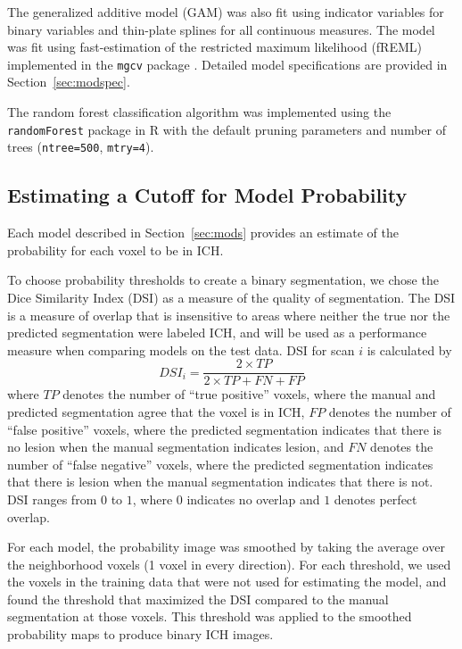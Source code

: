 \documentclass{elsarticle_nonatbib}\usepackage[]{graphicx}\usepackage[]{color}
\newcommand{\pkg}[1]{\texttt{#1}}
\newcommand{\code}[1]{\texttt{#1}}
\begin{document}
The generalized additive model (GAM) \citep{hastie_generalized_1986, hastie_generalized_1990} was also fit using indicator variables for binary variables and thin-plate splines for all continuous measures. The model was fit using fast-estimation of the restricted maximum likelihood (fREML) implemented in the \pkg{mgcv} package \citep{wood_fast_2011, wood_generalized_2015}.   Detailed model specifications are provided in Section~\ref{sec:modspec}.


The random forest \citep{breiman2001random} classification algorithm was implemented using the \pkg{randomForest} package in R \citep{randomForest} with the default pruning parameters and number of trees (\code{ntree=500}, \code{mtry=4}).



\subsection{Estimating a Cutoff for Model Probability}
\label{sec:cutoffs}
Each model described in Section~\ref{sec:mods} provides an estimate of the probability for each voxel to be in ICH.

To choose probability thresholds to create a binary segmentation, we chose the Dice Similarity Index (DSI) \citep{dice_measures_1945} as a measure of the quality of segmentation.  The DSI is a measure of overlap that is insensitive to areas where neither the true nor the predicted segmentation were labeled ICH, and will be used as a performance measure when comparing models on the test data.  DSI for scan $i$ is calculated by
 $$
 DSI_i = \frac{2 \times TP}{2\times TP + FN + FP}
 $$
where $TP$ denotes the number of ``true positive'' voxels, where the manual and predicted segmentation agree that the voxel is in ICH, $FP$ denotes the number of ``false positive'' voxels, where the predicted segmentation indicates that there is no lesion when the manual segmentation indicates lesion, and $FN$ denotes the number of ``false negative'' voxels, where the predicted segmentation indicates that there is lesion when the manual segmentation indicates that there is not. DSI ranges from $0$ to $1$, where $0$ indicates no overlap and $1$ denotes perfect overlap.

For each model, the probability image was smoothed by taking the average over the neighborhood voxels (1 voxel in every direction).
For each threshold, we used the voxels in the training data that were not used for estimating the model, and found the threshold that maximized the DSI compared to the manual segmentation at those voxels.  This threshold was applied to the smoothed probability maps to produce binary ICH images.
\end{document}
